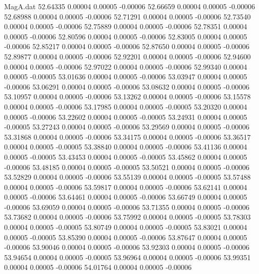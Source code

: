\begin{filecontents}{MagA.dat}
  52.64335    0.00004    0.00005   -0.00006
  52.66659    0.00004    0.00005   -0.00006
  52.68988    0.00004    0.00005   -0.00006
  52.71291    0.00004    0.00005   -0.00006
  52.73540    0.00004    0.00005   -0.00006
  52.75889    0.00004    0.00005   -0.00006
  52.78351    0.00004    0.00005   -0.00006
  52.80596    0.00004    0.00005   -0.00006
  52.83005    0.00004    0.00005   -0.00006
  52.85217    0.00004    0.00005   -0.00006
  52.87650    0.00004    0.00005   -0.00006
  52.89877    0.00004    0.00005   -0.00006
  52.92201    0.00004    0.00005   -0.00006
  52.94600    0.00004    0.00005   -0.00006
  52.97022    0.00004    0.00005   -0.00006
  52.99340    0.00004    0.00005   -0.00005
  53.01636    0.00004    0.00005   -0.00006
  53.03947    0.00004    0.00005   -0.00006
  53.06291    0.00004    0.00005   -0.00006
  53.08632    0.00004    0.00005   -0.00006
  53.10957    0.00004    0.00005   -0.00006
  53.13262    0.00004    0.00005   -0.00006
  53.15578    0.00004    0.00005   -0.00006
  53.17985    0.00004    0.00005   -0.00005
  53.20320    0.00004    0.00005   -0.00006
  53.22602    0.00004    0.00005   -0.00005
  53.24931    0.00004    0.00005   -0.00005
  53.27243    0.00004    0.00005   -0.00006
  53.29569    0.00004    0.00005   -0.00006
  53.31868    0.00004    0.00005   -0.00006
  53.34175    0.00004    0.00005   -0.00006
  53.36517    0.00004    0.00005   -0.00005
  53.38840    0.00004    0.00005   -0.00006
  53.41136    0.00004    0.00005   -0.00005
  53.43453    0.00004    0.00005   -0.00005
  53.45862    0.00004    0.00005   -0.00006
  53.48185    0.00004    0.00005   -0.00005
  53.50521    0.00004    0.00005   -0.00006
  53.52829    0.00004    0.00005   -0.00006
  53.55139    0.00004    0.00005   -0.00005
  53.57488    0.00004    0.00005   -0.00006
  53.59817    0.00004    0.00005   -0.00006
  53.62141    0.00004    0.00005   -0.00006
  53.64461    0.00004    0.00005   -0.00006
  53.66749    0.00004    0.00005   -0.00006
  53.69059    0.00004    0.00005   -0.00006
  53.71355    0.00004    0.00005   -0.00006
  53.73682    0.00004    0.00005   -0.00006
  53.75992    0.00004    0.00005   -0.00005
  53.78303    0.00004    0.00005   -0.00005
  53.80749    0.00004    0.00005   -0.00005
  53.83021    0.00004    0.00005   -0.00005
  53.85390    0.00004    0.00005   -0.00006
  53.87647    0.00004    0.00005   -0.00006
  53.90046    0.00004    0.00005   -0.00006
  53.92303    0.00004    0.00005   -0.00006
  53.94654    0.00004    0.00005   -0.00005
  53.96964    0.00004    0.00005   -0.00006
  53.99351    0.00004    0.00005   -0.00006
  54.01764    0.00004    0.00005   -0.00006

\end{filecontents}
